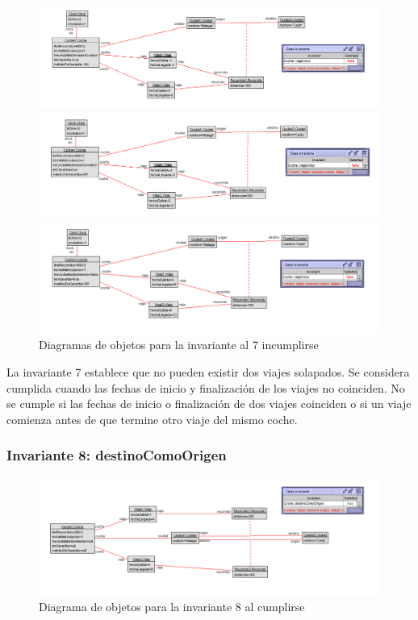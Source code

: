 \documentclass[12pt.a4paper]{article}
\begin{document}
  \begin{figure}[H]
    \centering
    \begin{minipage}{0.49\textwidth}
        \centering
        \includegraphics[width=\linewidth]{Soils/7_v2.png}
    \end{minipage}
    \hfill
    \begin{minipage}{0.49\textwidth}
        \centering
        \includegraphics[width=\linewidth]{Soils/7_v3.png}
    \end{minipage}
    \hfill
        \centering
        \includegraphics[width=0.7\linewidth]{Soils/7_v4.png}
    \caption{Diagramas de objetos para la invariante al 7 incumplirse}
\end{figure}

La invariante 7 establece que no pueden existir dos viajes solapados. Se considera cumplida cuando las fechas de inicio y finalización de los viajes no coinciden. No se cumple si las fechas de inicio o finalización de dos viajes coinciden o si un viaje comienza antes de que termine otro viaje del mismo coche.

\subsubsection{Invariante 8: destinoComoOrigen}

\vspace{1.0 cm}
\begin{figure}[H]
     \includegraphics[width=1\linewidth]{Soils/8.png}
     \caption{Diagrama de objetos para la invariante 8 al cumplirse}
\end{figure}
\end{document}
